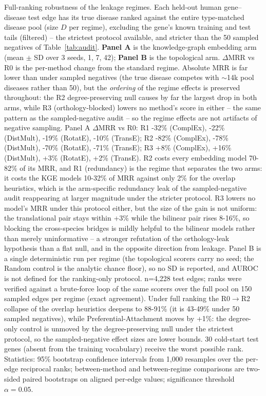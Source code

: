 \begin{table}[H]
\centering
\caption{Full-ranking robustness of the leakage regimes. Each held-out human gene--disease test edge has its true disease ranked against the entire type-matched disease pool (size $D$ per regime), excluding the gene's known training and test tails (filtered) -- the strictest protocol available, and stricter than the 50 sampled negatives of Table~\ref{tab:audit}. \textbf{Panel A} is the knowledge-graph embedding arm (mean $\pm$ SD over 3 seeds, 1, 7, 42); \textbf{Panel B} is the topological arm. $\Delta$MRR vs R0 is the per-method change from the standard regime. Absolute MRR is far lower than under sampled negatives (the true disease competes with $\sim$14k pool diseases rather than 50), but the \emph{ordering} of the regime effects is preserved throughout: the R2 degree-preserving null causes by far the largest drop in both arms, while R3 (orthology-blocked) lowers no method's score in either -- the same pattern as the sampled-negative audit -- so the regime effects are not artifacts of negative sampling. Panel A $\Delta$MRR vs R0: R1 -32\% (ComplEx), -22\% (DistMult), -19\% (RotatE), -10\% (TransE); R2 -82\% (ComplEx), -78\% (DistMult), -70\% (RotatE), -71\% (TransE); R3 +8\% (ComplEx), +16\% (DistMult), +3\% (RotatE), +2\% (TransE). R2 costs every embedding model 70-82\% of its MRR, and R1 (redundancy) is the regime that separates the two arms: it costs the KGE models 10-32\% of MRR against only 2\% for the overlap heuristics, which is the arm-specific redundancy leak of the sampled-negative audit reappearing at larger magnitude under the stricter protocol. R3 lowers no model's MRR under this protocol either, but the size of the gain is not uniform: the translational pair stays within +3\% while the bilinear pair rises 8-16\%, so blocking the cross-species bridges is mildly helpful to the bilinear models rather than merely uninformative -- a stronger refutation of the orthology-leak hypothesis than a flat null, and in the opposite direction from leakage. Panel B is a single deterministic run per regime (the topological scorers carry no seed; the Random control is the analytic chance floor), so no SD is reported, and AUROC is not defined for the ranking-only protocol. n=4,228 test edges; ranks were verified against a brute-force loop of the same scorers over the full pool on 150 sampled edges per regime (exact agreement). Under full ranking the R0$\to$R2 collapse of the overlap heuristics deepens to 88-91\% (it is 43-49\% under 50 sampled negatives), while Preferential-Attachment moves by +1\%: the degree-only control is unmoved by the degree-preserving null under the strictest protocol, so the sampled-negative effect sizes are lower bounds. 30 cold-start test genes (absent from the training vocabulary) receive the worst possible rank. Statistics: 95\% bootstrap confidence intervals from 1,000 resamples over the per-edge reciprocal ranks; between-method and between-regime comparisons are two-sided paired bootstraps on aligned per-edge values; significance threshold $\alpha = 0.05$.}

\end{table}

